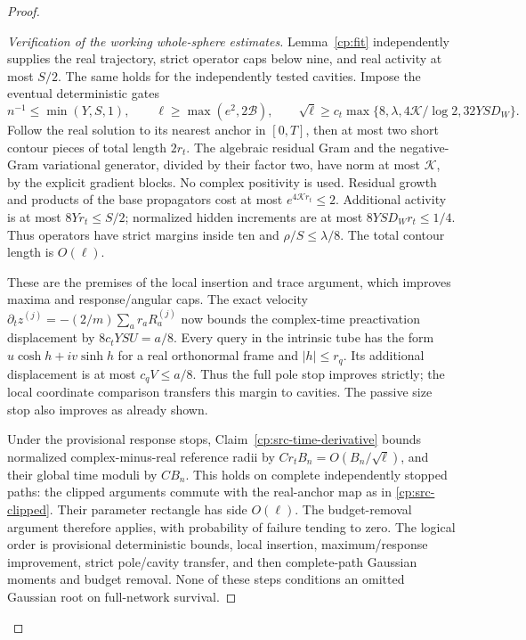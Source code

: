 \begin{proof}
\begin{proof}[Verification of the working whole-sphere estimates]
\label{cp:src-whole-sphere-verification}
Lemma~\ref{cp:fit} independently supplies the real trajectory, strict
operator caps below nine, and real activity at most \(S/2\).
The same holds for the independently tested cavities.  Impose the
eventual deterministic gates
\begin{equation}
 n^{-1}\le\min(Y,S,1),\qquad \ell\ge\max(e^2,2\mathcal B),
 \qquad \sqrt\ell\ge c_t
       \max\{8,\lambda,4\mathcal K/\log2,32YSD_W\}.
 \label{cp:src-rectangle-gates}
\end{equation}
Follow the real solution to its nearest anchor in \([0,T]\), then
at most two short contour pieces of total length \(2r_t\).
The algebraic residual Gram and the negative-Gram variational
generator, divided by their factor two, have norm at most
\(\mathcal K\), by the explicit gradient blocks.  No complex
positivity is used.  Residual growth and products of the base
propagators cost at most \(e^{4\mathcal Kr_t}\le2\).
Additional activity is at most \(8Yr_t\le S/2\);
normalized hidden increments are at most \(8YSD_Wr_t\le1/4\).
Thus operators have strict margins inside ten and \(\rho/S\le\lambda/8\).
The total contour length is \(O(\ell)\).

These are the premises of the local insertion and trace argument,
which improves maxima and response/angular caps.  The exact velocity
\(\partial_tz^{(j)}=-(2/m)\sum_ar_aR_a^{(j)}\) now bounds the
complex-time preactivation displacement by \(8c_tYSU=a/8\).
Every query in the intrinsic tube has the form
\(u\cosh h+iv\sinh h\) for a real orthonormal frame and
\(|h|\le r_q\).  Its additional displacement is at most
\(c_qV\le a/8\).  Thus the full pole stop improves strictly;
the local coordinate comparison transfers this margin to cavities.
The passive size stop also improves as already shown.

Under the provisional response stops, Claim~\ref{cp:src-time-derivative}
bounds normalized complex-minus-real reference radii by
\(C r_tB_n=O(B_n/\sqrt\ell)\), and their global time moduli
by \(CB_n\).  This holds on complete independently stopped paths:
the clipped arguments commute with the real-anchor map as in
\eqref{cp:src-clipped}.  Their parameter rectangle has side
\(O(\ell)\).  The budget-removal argument therefore applies,
with probability of failure tending to zero.  The logical order is
provisional deterministic bounds, local insertion, maximum/response
improvement, strict pole/cavity transfer, and then complete-path
Gaussian moments and budget removal.  None of these steps conditions
an omitted Gaussian root on full-network survival.


\end{proof}
\end{proof}
